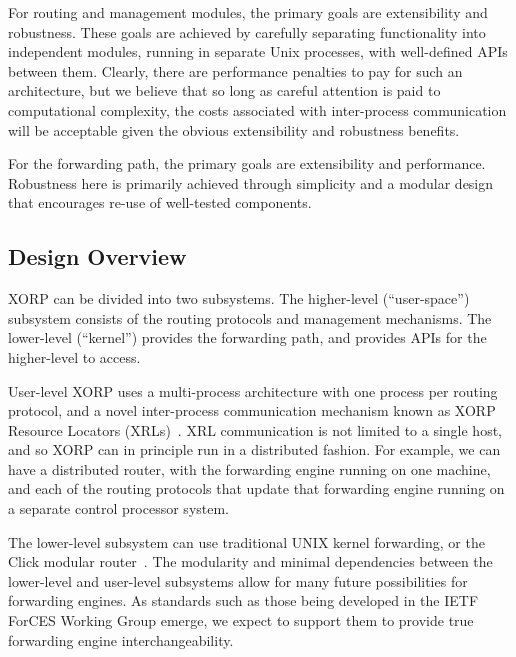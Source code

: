 \documentclass[11pt]{article}
\begin{document}
For routing and management modules, the primary goals are
extensibility and robustness.  These goals are achieved by carefully
separating functionality into independent modules, running in separate
Unix processes, with well-defined APIs between them.  Clearly, there
are performance penalties to pay for such an architecture, but we
believe that so long as careful attention is paid to computational
complexity, the costs associated with inter-process communication will
be acceptable given the obvious extensibility and robustness benefits.

For the forwarding path, the primary goals are extensibility and
performance.  Robustness here is primarily achieved through
simplicity and a modular design that encourages re-use of well-tested
components.


\subsection{Design Overview}

XORP can be divided into two subsystems. The higher-level
(``user-space'') subsystem consists of the routing protocols and
management mechanisms. The lower-level (``kernel'') provides the
forwarding path, and provides APIs for the higher-level to access.

User-level XORP uses a multi-process architecture with one process per
routing protocol, and a novel inter-process communication mechanism
known as XORP Resource Locators (XRLs)~\cite{xorp:xrl}. XRL
communication is not limited to a single host, and so XORP can in
principle run in a distributed fashion. For example, we can have a
distributed router, with the forwarding engine running on one machine,
and each of the routing protocols that update that forwarding engine
running on a separate control processor system.

The lower-level subsystem can use traditional UNIX kernel forwarding,
or the Click modular router~\cite{CLICK-PROJECT}. The modularity and
minimal dependencies between the lower-level and user-level subsystems
allow for many future possibilities for forwarding engines.  As
standards such as those being developed in the IETF ForCES Working
Group emerge, we expect to support them to provide true forwarding
engine interchangeability.
\end{document}

